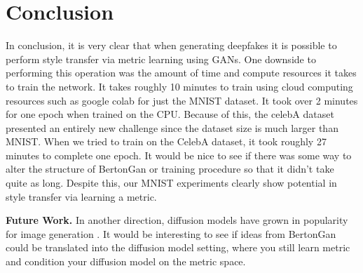 \documentclass{article}
\begin{document}


\section{Conclusion}

In conclusion, it is very clear that when generating deepfakes it is possible to perform style transfer via metric learning using GANs. One downside to
performing this operation was the amount of time and compute resources it takes to train the network. It takes roughly 10 minutes to train using cloud
computing resources such as google colab for just the MNIST dataset.
It took over 2 minutes for one epoch when trained on the CPU. Because of this, the celebA dataset presented an entirely new challenge since the
dataset size is much larger than MNIST.
When we tried to train on the CelebA dataset, it took roughly 27 minutes to complete one epoch.
It would be nice to see if there was some way to alter the structure of BertonGan or training procedure so that it didn't take quite as long.
Despite this, our MNIST experiments clearly show potential in style transfer via learning a metric.

	{\bf Future Work.} In another direction, diffusion models have grown in popularity for image generation \cite{croitoru2022diffusion}. It would be interesting to see if ideas from BertonGan could be translated into the diffusion model setting, where you still learn metric and condition your diffusion model on the metric space.



\pagebreak



\end{document}
